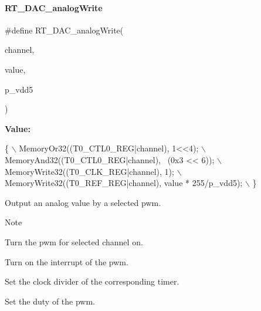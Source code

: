 \paragraph{\texorpdfstring{R\+T\+\_\+\+D\+A\+C\+\_\+analog\+Write}{RT\_DAC\_analogWrite}}
{\footnotesize\ttfamily \#define R\+T\+\_\+\+D\+A\+C\+\_\+analog\+Write(\begin{DoxyParamCaption}\item[{}]{channel,  }\item[{}]{value,  }\item[{}]{p\+\_\+vdd5 }\end{DoxyParamCaption})}

{\bfseries Value\+:}
\begin{DoxyCode}
\{                                                                   \(\backslash\)
    MemoryOr32((T0\_CTL0\_REG|channel), 1<<4);                        \(\backslash\)
    MemoryAnd32((T0\_CTL0\_REG|channel), ~(0x3 << 6));                \(\backslash\)
    MemoryWrite32((T0\_CLK\_REG|channel), 1);                         \(\backslash\)
    MemoryWrite32((T0\_REF\_REG|channel), value * 255/p\_vdd5);        \(\backslash\)
\}
\end{DoxyCode}


Output an analog value by a selected pwm. 

\begin{DoxyNote}{Note}

\begin{DoxyEnumerate}
\item Turn the pwm for selected channel on.
\item Turn on the interrupt of the pwm.
\item Set the clock divider of the corresponding timer.
\item Set the duty of the pwm. 
\end{DoxyEnumerate}
\end{DoxyNote}

